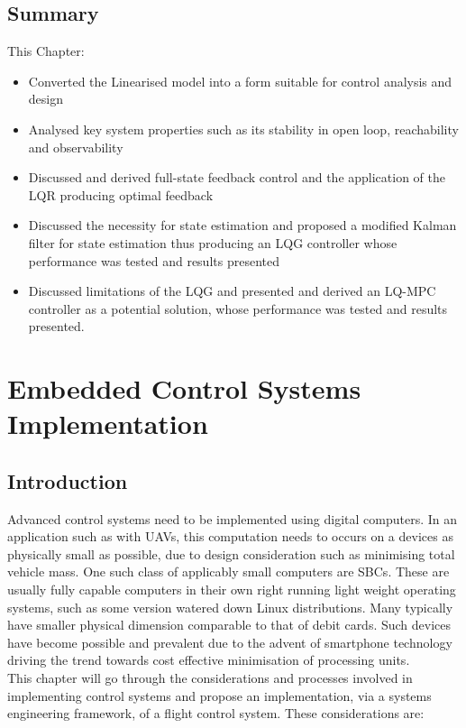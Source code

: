 \documentclass[12pt,a4paper,twoside]{report}
\begin{document}
			\newpage
			
		\section{Summary}
			
			This Chapter:
			\begin{itemize}
				\item 
					Converted the Linearised model into a form suitable for control analysis and design
				\item 
					Analysed key system properties such as its stability in open loop, reachability and observability 
				\item
					Discussed and derived full-state feedback control and the application of the LQR producing optimal feedback
				\item
					Discussed the necessity for state estimation and proposed a modified Kalman filter for state estimation thus producing an LQG controller whose performance was tested and results presented
				\item
					Discussed limitations of the LQG and presented and derived an LQ-MPC controller as a potential solution, whose performance was tested and results presented.
			\end{itemize}
		
	\newpage
		
	\chapter{Embedded Control Systems Implementation}
		
		\section{Introduction}
			
			Advanced control systems need to be implemented using digital computers. In an application such as with UAVs, this computation needs to occurs on a devices as physically small as possible, due to design consideration such as minimising total vehicle mass. One such class of applicably small computers are SBCs. These are usually fully capable computers in their own right running light weight operating systems, such as some version watered down Linux distributions. Many typically have smaller physical dimension comparable to that of debit cards. Such devices have become possible and prevalent due to the advent of smartphone technology driving the trend towards cost effective minimisation of processing units. 
			\\
		 	This chapter will go through the considerations and processes involved in implementing control systems and propose an implementation, via a systems engineering framework, of a flight control system. These considerations are:
			
\end{document}
